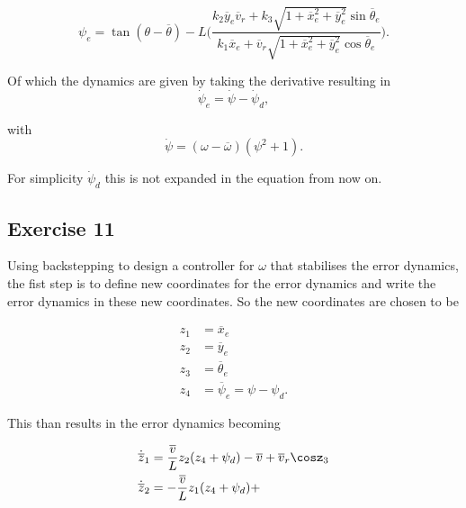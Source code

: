 \begin{equation}
    \psi_e = \tan(\theta-\overline{\theta}) - L \Big( \frac{k_2\overline{y}_e\overline{v}_r + k_3 \sqrt{1+\overline{x}_e^2+\overline{y}_e^2}\sin\overline{\theta}_e}{k_1\overline{x}_e + \overline{v}_r\sqrt{1+\overline{x}_e^2+\overline{y}_e^2}\cos\overline{\theta}_e} \Big). \label{eq:ex10_psi_e}
\end{equation}

Of which the dynamics are given by taking the derivative resulting in
\begin{equation}
    \dot{\psi}_e = \dot{\psi} - \dot{\psi}_d, \label{eq:ex10_psiedot}
\end{equation}

with
\begin{equation}
    \dot{\psi} = (\omega - \overline{\omega})(\psi^2 + 1). \label{eq:ex10_psidot}
\end{equation}

For simplicity $\dot{\psi}_d$ this is not expanded in the equation from now on.

\subsection{Exercise 11}
Using backstepping to design a controller for $\omega$ that stabilises the error dynamics, the fist step is to define new coordinates for the error dynamics and write the error dynamics in these new coordinates. So the new coordinates are chosen to be

\begin{align}
    z_1 &= \overline{x}_e \label{eq:ex11_newcoordsz_1} \\
    z_2 &= \overline{y}_e \label{eq:ex11_newcoordsz_2} \\
    z_3 &= \overline{\theta}_e \label{eq:ex11_newcoordsz_3} \\
    z_4 &= \overline{\psi}_e  = \psi - \psi_d \label{eq:ex11_newcoordsz_4}.
\end{align}

This than results in the error dynamics becoming

\begin{align}
    \dot{\overline{z}}_1 &= \frac{\overline{v}}{L}z_2(z_4+\psi_d) - \overline{v} + \overline{v}_r\cosz_3 \label{eq:ex11_dynz_1} \\
    \dot{\overline{z}}_2 &= -\frac{\overline{v}}{L}z_1(z_4+\psi_d) + \
\end{align}



